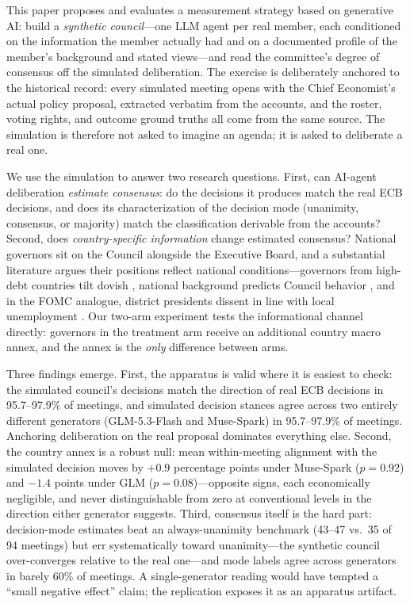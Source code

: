 \documentclass[11pt,a4paper]{article}
\begin{document}
This paper proposes and evaluates a measurement strategy based on generative AI: build a \emph{synthetic council}---one LLM agent per real member, each conditioned on the information the member actually had and on a documented profile of the member's background and stated views---and read the committee's degree of consensus off the simulated deliberation. The exercise is deliberately anchored to the historical record: every simulated meeting opens with the Chief Economist's actual policy proposal, extracted verbatim from the accounts, and the roster, voting rights, and outcome ground truths all come from the same source. The simulation is therefore not asked to imagine an agenda; it is asked to deliberate a real one.

We use the simulation to answer two research questions. First, can AI-agent deliberation \emph{estimate consensus}: do the decisions it produces match the real ECB decisions, and does its characterization of the decision mode (unanimity, consensus, or majority) match the classification derivable from the accounts? Second, does \emph{country-specific information} change estimated consensus? National governors sit on the Council alongside the Executive Board, and a substantial literature argues their positions reflect national conditions---governors from high-debt countries tilt dovish \parencite{heinemann2021fiscal}, national background predicts Council behavior \parencite{badinger2013national}, and in the FOMC analogue, district presidents dissent in line with local unemployment \parencite{bobrov2024regional}. Our two-arm experiment tests the informational channel directly: governors in the treatment arm receive an additional country macro annex, and the annex is the \emph{only} difference between arms.

Three findings emerge. First, the apparatus is valid where it is easiest to check: the simulated council's decisions match the direction of real ECB decisions in 95.7--97.9\% of meetings, and simulated decision stances agree across two entirely different generators (GLM-5.3-Flash and Muse-Spark) in 95.7--97.9\% of meetings. Anchoring deliberation on the real proposal dominates everything else. Second, the country annex is a robust null: mean within-meeting alignment with the simulated decision moves by $+0.9$ percentage points under Muse-Spark ($p = 0.92$) and $-1.4$ points under GLM ($p = 0.08$)---opposite signs, each economically negligible, and never distinguishable from zero at conventional levels in the direction either generator suggests. Third, consensus itself is the hard part: decision-mode estimates beat an always-unanimity benchmark (43--47 vs.\ 35 of 94 meetings) but err systematically toward unanimity---the synthetic council over-converges relative to the real one---and mode labels agree across generators in barely 60\% of meetings. A single-generator reading would have tempted a ``small negative effect'' claim; the replication exposes it as an apparatus artifact.
\end{document}
